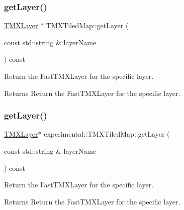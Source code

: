 \subsubsection{\texorpdfstring{get\+Layer()}{getLayer()}\hspace{0.1cm}{\footnotesize\ttfamily [1/2]}}
{\footnotesize\ttfamily \hyperlink{classexperimental_1_1TMXLayer}{T\+M\+X\+Layer} $\ast$ T\+M\+X\+Tiled\+Map\+::get\+Layer (\begin{DoxyParamCaption}\item[{const std\+::string \&}]{layer\+Name }\end{DoxyParamCaption}) const}

Return the Fast\+T\+M\+X\+Layer for the specific layer.

\begin{DoxyReturn}{Returns}
Return the Fast\+T\+M\+X\+Layer for the specific layer. 
\end{DoxyReturn}
\mbox{\label{classexperimental_1_1TMXTiledMap_a4dce6f5fba13afb702d1c2cb62397f1e}} 
\subsubsection{\texorpdfstring{get\+Layer()}{getLayer()}\hspace{0.1cm}{\footnotesize\ttfamily [2/2]}}
{\footnotesize\ttfamily \hyperlink{classexperimental_1_1TMXLayer}{T\+M\+X\+Layer}$\ast$ experimental\+::\+T\+M\+X\+Tiled\+Map\+::get\+Layer (\begin{DoxyParamCaption}\item[{const std\+::string \&}]{layer\+Name }\end{DoxyParamCaption}) const}

Return the Fast\+T\+M\+X\+Layer for the specific layer.

\begin{DoxyReturn}{Returns}
Return the Fast\+T\+M\+X\+Layer for the specific layer. 
\end{DoxyReturn}
\mbox{\label{classexperimental_1_1TMXTiledMap_a2ef62c3afec1af3e4368c9123b28e53b}} 
